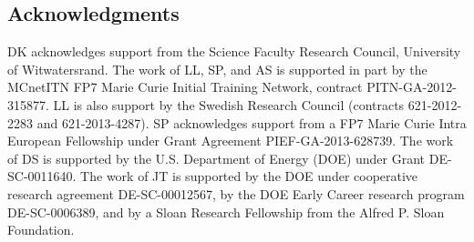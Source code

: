 \documentclass[11pt]{cernrep}
\begin{document}
\subsection*{Acknowledgments}

DK acknowledges support from the Science Faculty Research Council, University of Witwatersrand.
%
The work of LL, SP, and AS is supported in part by the MCnetITN FP7 Marie Curie Initial Training Network, contract PITN-GA-2012-315877.
%
LL is also support by the Swedish Research Council (contracts 621-2012-2283 and 621-2013-4287).
%
SP acknowledges support from a FP7 Marie Curie Intra European Fellowship under Grant Agreement PIEF-GA-2013-628739.
%
The work of DS is supported by the U.S. Department of Energy (DOE) under Grant DE-SC-0011640.
%
The work of JT is supported by the DOE under cooperative research agreement DE-SC-00012567, by the DOE Early Career research program DE-SC-0006389, and by a Sloan Research Fellowship from the Alfred P. Sloan Foundation.


\end{document}

